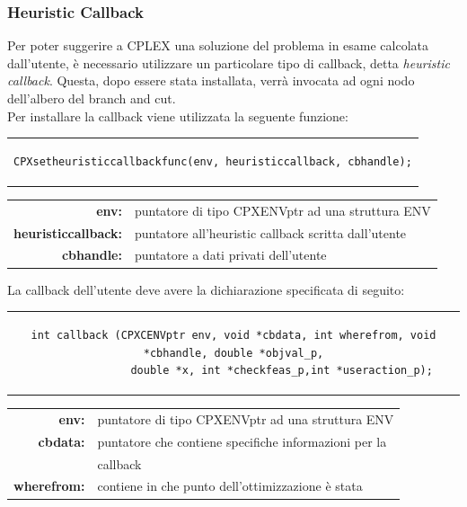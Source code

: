 \subsubsection{Heuristic Callback}
Per poter suggerire a CPLEX una soluzione del problema in esame calcolata dall'utente, è necessario utilizzare un particolare tipo di callback, detta \textit{heuristic callback}. Questa, dopo essere stata installata, verrà invocata ad ogni nodo dell'albero del branch and cut.\\
Per installare la callback viene utilizzata la seguente funzione:
\begin{center}
\begin{tabular}{c}
\begin{lstlisting}[linewidth=382pt, basicstyle=\footnotesize\sffamily,]    
CPXsetheuristiccallbackfunc(env, heuristiccallback, cbhandle);
\end{lstlisting}
\end{tabular}
\begin{table}[h]
\centering
\begin{tabular}{rl}
\textbf{env:} & {puntatore di tipo CPXENVptr ad una struttura ENV}\\
\textbf{heuristiccallback:} & {puntatore all'heuristic callback scritta dall'utente}\\
\textbf{cbhandle:} & {puntatore a dati privati dell'utente}\\
\end{tabular}
\end{table}
La callback dell'utente deve avere la dichiarazione specificata di seguito:
\begin{center}
\begin{tabular}{c}
\begin{lstlisting}[linewidth=382pt, basicstyle=\footnotesize\sffamily,] 
 int callback (CPXCENVptr env, void *cbdata, int wherefrom, void *cbhandle, double *objval_p,
               double *x, int *checkfeas_p,int *useraction_p);
\end{lstlisting}
\end{tabular}
\begin{table}[h]
\centering
\begin{tabular}{rl}
\textbf{env:} & {puntatore di tipo CPXENVptr ad una struttura ENV}\\
\textbf{cbdata:} & {puntatore che contiene specifiche informazioni per la}\\
&{callback}\\
\textbf{wherefrom:} & {contiene in che punto dell'ottimizzazione è stata} \\ 

\end{tabular}
\end{table}
\end{center}
\end{center}
